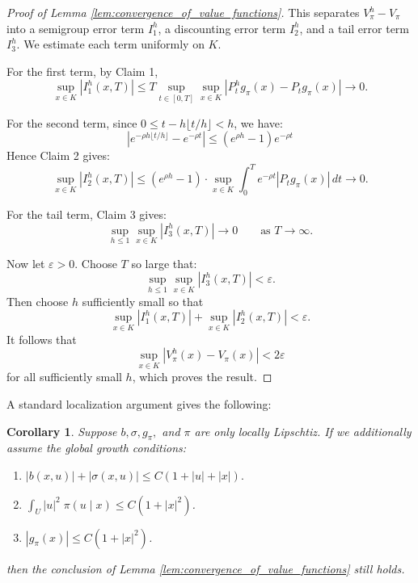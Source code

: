 \documentclass[11pt,oneside,reqno]{article}
\theoremstyle{plain}
\newtheorem{corollary}[theorem]{Corollary}
\theoremstyle{definition}
\numberwithin{equation}{section}
\renewcommand{\leq}{\leqslant}
\begin{document}
\begin{proof}[Proof of Lemma \ref{lem:convergence_of_value_functions}]
\noindent This separates $V_\pi^h - V_\pi$ into a semigroup error term $I_1^h$, a discounting error term $I_2^h$, and a tail error term $I_3^h$.
 We estimate each term uniformly on $K$. 

For the first term, by Claim 1,
\[
\sup_{x\in K}|I_1^h(x,T)|
\le
T \sup_{t\in[0,T]}\sup_{x\in K}|P_t^h g_\pi(x)-P_t g_\pi(x)|
\to 0.
\]

\noindent For the second term, since $0\le t-h\lfloor t/h\rfloor < h$, we have:
\[
|e^{-\rho h\lfloor t/h\rfloor}-e^{-\rho t}|
\le (e^{\rho h} - 1) e^{-\rho t}
\]
 \noindent Hence Claim 2 gives:
\[
\sup_{x\in K}|I_2^h(x,T)|
\le
(e^{\rho h} - 1) \cdot \sup_{x\in K} \int_0^T e^{-\rho t}|P_t g_\pi(x)|\,dt
\to 0.
\]

\noindent For the tail term, Claim 3 gives:
\[
\sup_{h\le1}\sup_{x\in K}|I_3^h(x,T)|\to 0
\qquad \text{as } T\to\infty.
\]

\noindent Now let $\varepsilon>0$. Choose $T$ so large that:
\[
\sup_{h\le1}\sup_{x\in K}|I_3^h(x,T)|<\varepsilon.
\]
Then choose $h$ sufficiently small so that
\[
\sup_{x\in K}|I_1^h(x,T)|+\sup_{x\in K}|I_2^h(x,T)|<\varepsilon.
\]
It follows that
\[
\sup_{x\in K}|V_\pi^h(x)-V_\pi(x)|<2\varepsilon
\]
for all sufficiently small $h$, which proves the result. 
\end{proof}

\noindent A standard localization argument gives the following:

\begin{corollary}
	Suppose $b, \sigma, g_\pi,$ and $\pi$ are only locally Lipschtiz. If we additionally 
	assume the global growth conditions:

	\begin{enumerate}[label=(\roman*)]
		\item $|b(x,u)| + |\sigma(x,u)| \leq C(1 + |u| + |x|).$
		\item $\int_U |u|^2 \; \pi(u \mid x) \leq C(1+ |x|^2)$.
		\item $|g_\pi(x)| \leq C(1 + |x|^2)$. 
	\end{enumerate}
	\noindent then the conclusion of Lemma \ref{lem:convergence_of_value_functions} still holds.
	\label{corr:conv_value_with_local_lipschitz}
\end{corollary}
\end{document}
